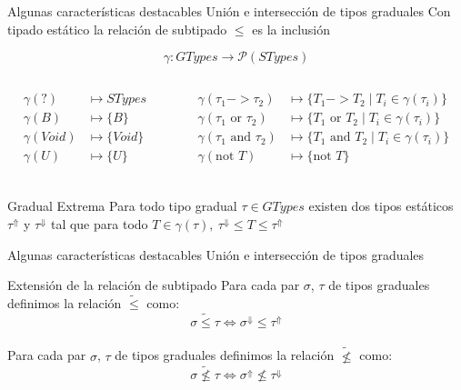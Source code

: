 \documentclass[compress]{beamer}
\begin{document}
\begin{frame}{Algunas características destacables}
	{Unión e intersección de tipos graduales}
	Con tipado estático la relación de subtipado $\leq$ es la inclusión
	
	\[\gamma \colon GTypes \to \mathcal{P}(STypes)\]
	
	\vspace{-0.6cm}
	\begin{columns}
		\begin{column}{0.5\paperwidth}	
			\begin{align*}
			\gamma(?) &\mapsto STypes \\
			\gamma(B) &\mapsto \{B\} \\
			\gamma(Void) &\mapsto \{Void\} \\
			\gamma(U) &\mapsto \{U\} \\
			\end{align*}
		\end{column}
		\hspace{-2cm}
		\begin{column}{0.5\paperwidth}
			\begin{align*}
			\gamma(\tau_1 -> \tau_2) &\mapsto \{T_1 -> T_2 \mid T_i \in \gamma(\tau_i)\} \\	
			\gamma(\tau_1 \text{ or } \tau_2) &\mapsto \{T_1 \text{ or } T_2 \mid T_i \in \gamma(\tau_i)\} \\
			\gamma(\tau_1 \text{ and } \tau_2) &\mapsto \{T_1 \text{ and } T_2 \mid T_i \in \gamma(\tau_i)\} \\
			\gamma(\text{not } T) &\mapsto \{\text{not } T\} \\
			\end{align*}
		\end{column}
	\end{columns}

	\begin{block}{Gradual Extrema}
		Para todo tipo gradual $\tau \in GTypes$ existen dos tipos estáticos $\tau^{\Uparrow}$ y $\tau^{\Downarrow}$ tal que para todo $T \in \gamma(\tau),\ \tau^{\Downarrow} \leq T \leq \tau^{\Uparrow}$
	\end{block}
\end{frame}

\begin{frame}{Algunas características destacables}
	{Unión e intersección de tipos graduales}
	\vspace{-0.5cm}
	\begin{block}{Extensión de la relación de subtipado}
		Para cada par $\sigma$, $\tau$ de tipos graduales definimos la relación $\widetilde{\leq}$ como:
		$$\sigma \widetilde{\leq} \tau \Leftrightarrow \sigma^{\Downarrow} \leq \tau^{\Uparrow}$$\\
		
		Para cada par $\sigma$, $\tau$ de tipos graduales definimos la relación $\widetilde{\nleq}$ como:
		$$\sigma \widetilde{\nleq} \tau \Leftrightarrow \sigma^{\Uparrow} \nleq \tau^{\Downarrow}$$\\
	\end{block}
\end{frame}
\end{document}
